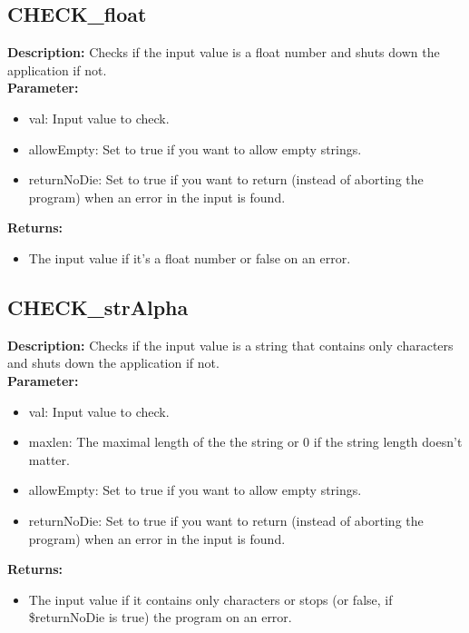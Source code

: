 \subsection{CHECK\_float}
\textbf{Description:} Checks if the input value is a float number and shuts down the application if not.\\
\textbf{Parameter:}
\begin{itemize}
\item val: Input value to check.
\item allowEmpty: Set to true if you want to allow empty strings.
\item returnNoDie: Set to true if you want to return (instead of aborting the program) when an error in the input is found.
\end{itemize}
\textbf{Returns:}
\begin{itemize}
\item The input value if it's a float number or false on an error.
\end{itemize}

\subsection{CHECK\_strAlpha}
\textbf{Description:} Checks if the input value is a string that contains only characters and shuts down the application if not.\\
\textbf{Parameter:}
\begin{itemize}
\item val: Input value to check.
\item maxlen: The maximal length of the the string or 0 if the string length doesn't matter.
\item allowEmpty: Set to true if you want to allow empty strings.
\item returnNoDie: Set to true if you want to return (instead of aborting the program) when an error in the input is found.
\end{itemize}
\textbf{Returns:}
\begin{itemize}
\item The input value if it contains only characters or stops (or false, if \$returnNoDie is true) the program on an error.
\end{itemize}

